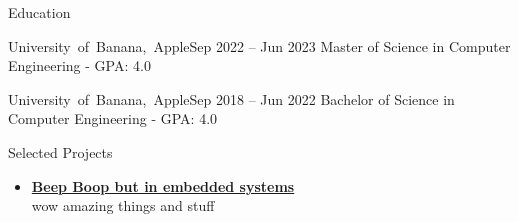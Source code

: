 \documentclass[]{../mcdowellcv}
\begin{document}
\makeheader

\begin{cvsection}{Education}

    \begin{cvsubsection}{\mbox {University of Banana, Apple}}{}{Sep 2022 -- Jun 2023}
        Master of Science in Computer Engineering - GPA: 4.0
    \end{cvsubsection}
    
    \begin{cvsubsection}{\mbox {University of Banana, Apple}}{}{Sep 2018 -- Jun 2022}
        Bachelor of Science in Computer Engineering - GPA: 4.0
    \end{cvsubsection}
    
\end{cvsection}


\begin{cvsection}{Selected Projects}

        \begin{cvsubsection}{}{}{}
            \begin{itemize}
                \setlength\itemsep{3pt}
                \item\textbf{\href{https://github.com/johndoe/beepboop}{Beep Boop but in embedded systems}} \\
                wow amazing things and stuff
            \end{itemize}
        \end{cvsubsection}
    
\end{cvsection}
\end{document}

